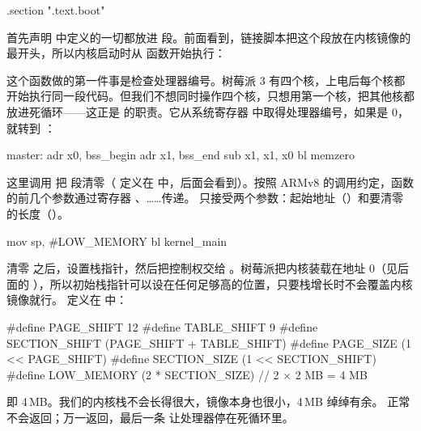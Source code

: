\begin{asmcode}
.section ".text.boot"
\end{asmcode}

首先声明  中定义的一切都放进  段。前面看到，链接脚本把这个段放在内核镜像的最开头，所以内核启动时从  函数开始执行：


这个函数做的第一件事是检查处理器编号。树莓派 3 有四个核，上电后每个核都开始执行同一段代码。但我们不想同时操作四个核，只想用第一个核，把其他核都放进死循环——这正是  的职责。它从系统寄存器  中取得处理器编号，如果是 0，就转到 ：

\begin{asmcode}
master:
	adr	x0, bss_begin
	adr	x1, bss_end
	sub	x1, x1, x0
	bl 	memzero
\end{asmcode}

这里调用  把  段清零（ 定义在  中，后面会看到）。按照 ARMv8 的调用约定，函数的前几个参数通过寄存器 、……传递。 只接受两个参数：起始地址（）和要清零的长度（）。

\begin{asmcode}
	mov	sp, #LOW_MEMORY
	bl	kernel_main
\end{asmcode}

清零  之后，设置栈指针，然后把控制权交给 。树莓派把内核装载在地址 0（见后面的 ），所以初始栈指针可以设在任何足够高的位置，只要栈增长时不会覆盖内核镜像就行。 定义在  中：

\begin{ccode}
#define PAGE_SHIFT      12
#define TABLE_SHIFT     9
#define SECTION_SHIFT   (PAGE_SHIFT + TABLE_SHIFT)
#define PAGE_SIZE       (1 << PAGE_SHIFT)
#define SECTION_SIZE    (1 << SECTION_SHIFT)
#define LOW_MEMORY      (2 * SECTION_SIZE)       // 2 × 2 MB = 4 MB
\end{ccode}

即 4\,MB。我们的内核栈不会长得很大，镜像本身也很小，4\,MB 绰绰有余。 正常不会返回；万一返回，最后一条  让处理器停在死循环里。


